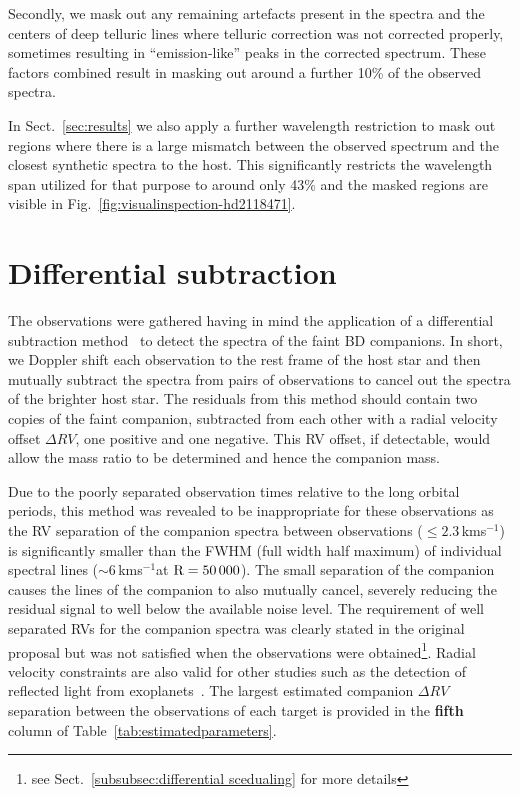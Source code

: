 \documentclass[fleqn,usenatbib]{mnras}
\newcommand{\kmps}{\,kms\(^{-1}\)}	%
\newcommand*\rd{\color{red}}
\begin{document}
Secondly, we mask out any remaining artefacts present in the spectra and the centers of deep telluric lines where telluric correction was not corrected properly, sometimes resulting in ``emission-like'' peaks in the corrected spectrum. These factors combined result in masking out around a further 10\% of the observed spectra. 

In Sect.~\ref{sec:results} we also apply a further wavelength restriction to mask out regions where there is a large mismatch between the observed spectrum and the closest synthetic spectra to the host. This significantly restricts the wavelength span utilized for that purpose to around only 43\% and the masked regions are visible in Fig.~\ref{fig:visualinspection-hd2118471}. 


\section{Differential subtraction}
\label{sec:spec_diff}

The observations were gathered having in mind the application of a differential subtraction method~\citep[e.g.][]{ferluga_separating_1997, kostogryz_spectral_2013} to detect the spectra of the faint BD companions. In short, we Doppler shift each observation to the rest frame of the host star and then mutually subtract the spectra from pairs of observations to cancel out the spectra of the brighter host star. The residuals from this method should contain two copies of the faint companion, subtracted from each other with a radial velocity offset \(\Delta RV\), one positive and one negative. This RV offset, if detectable, would allow the mass ratio to be determined and hence the companion mass. 

Due to the poorly separated observation times relative to the long orbital periods, this method was revealed to be inappropriate for these observations as the RV separation of the companion spectra between observations (\(\le 2.3\)\kmps{}) is significantly smaller than the FWHM (full width half maximum) of individual spectral lines (\(\sim\)6\kmps at \(\rm R=50\,000\)).  The small separation of the companion causes the lines of the companion to also mutually cancel, severely reducing the residual signal to well below the available noise level. The requirement of well separated RVs for the companion spectra was clearly stated in the original proposal but was not satisfied when the observations were obtained\footnote{see Sect.~\ref{subsubsec:differential scedualing} for more details}. Radial velocity constraints are also valid for other studies such as the detection of reflected light from exoplanets~\cite{martins_evidence_2015}. The largest estimated companion \(\Delta RV\) separation between the observations of each target is provided in the {\rd \textbf{fifth}} column of Table~\ref{tab:estimatedparameters}. 
\end{document}
